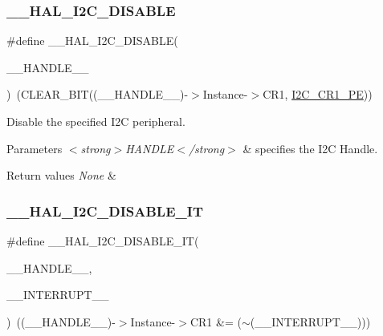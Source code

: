 \subsubsection{\texorpdfstring{\_\_HAL\_I2C\_DISABLE}{\_\_HAL\_I2C\_DISABLE}}
{\footnotesize\ttfamily \#define \+\_\+\+\_\+\+H\+A\+L\+\_\+\+I2\+C\+\_\+\+D\+I\+S\+A\+B\+LE(\begin{DoxyParamCaption}\item[{}]{\+\_\+\+\_\+\+H\+A\+N\+D\+L\+E\+\_\+\+\_\+ }\end{DoxyParamCaption})~(C\+L\+E\+A\+R\+\_\+\+B\+IT((\+\_\+\+\_\+\+H\+A\+N\+D\+L\+E\+\_\+\+\_\+)-\/$>$Instance-\/$>$C\+R1, \mbox{\hyperlink{group___peripheral___registers___bits___definition_ga953b0d38414808db79da116842ed3262}{I2\+C\+\_\+\+C\+R1\+\_\+\+PE}}))}



Disable the specified I2C peripheral. 


\begin{DoxyParams}{Parameters}
{\em $<$strong$>$\+H\+A\+N\+D\+L\+E$<$/strong$>$} & specifies the I2C Handle. \\
\hline
\end{DoxyParams}

\begin{DoxyRetVals}{Return values}
{\em None} & \\
\hline
\end{DoxyRetVals}
\mbox{\label{group___i2_c___exported___macros_ga33d0c7202ae298fa3ae128c5da49d455}} 
\subsubsection{\texorpdfstring{\_\_HAL\_I2C\_DISABLE\_IT}{\_\_HAL\_I2C\_DISABLE\_IT}}
{\footnotesize\ttfamily \#define \+\_\+\+\_\+\+H\+A\+L\+\_\+\+I2\+C\+\_\+\+D\+I\+S\+A\+B\+L\+E\+\_\+\+IT(\begin{DoxyParamCaption}\item[{}]{\+\_\+\+\_\+\+H\+A\+N\+D\+L\+E\+\_\+\+\_\+,  }\item[{}]{\+\_\+\+\_\+\+I\+N\+T\+E\+R\+R\+U\+P\+T\+\_\+\+\_\+ }\end{DoxyParamCaption})~((\+\_\+\+\_\+\+H\+A\+N\+D\+L\+E\+\_\+\+\_\+)-\/$>$Instance-\/$>$C\+R1 \&= ($\sim$(\+\_\+\+\_\+\+I\+N\+T\+E\+R\+R\+U\+P\+T\+\_\+\+\_\+)))}



